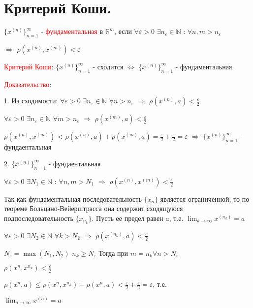 \section{Критерий Коши.}

$\{x^{(n)}\}_{n=1}^{\infty}$ - \textcolor{red} {фундаментальная} в $\mathbb {R}^m$, если $\forall \varepsilon > 0$ $\exists n_\varepsilon \in \mathbb {N}$ : $\forall n, m > n_\varepsilon$

$\Rightarrow$ $\rho (x^{(n)}, x^{(m)})  < \varepsilon$
\vspace{1cm}

\textcolor{red}{Критерий Коши}:  $\{x^{(n)}\}_{n=1}^{\infty}$ - сходится $\Leftrightarrow$ $\{x^{(n)}\}_{n=1}^{\infty}$ - фундаментальная.
\vspace{1cm}

\textcolor{red}{Доказательство}:

1. Из сходимости: $\forall \varepsilon > 0$ $ \exists n_\varepsilon \in \mathbb {N}$ $\forall n > n_\varepsilon $ $\Rightarrow$ $\rho(x^{(n)}, a) < \frac{\varepsilon}{2}$

$\forall \varepsilon > 0$ $\exists n_\varepsilon \in \mathbb {N}$ $\forall m > n_\varepsilon $ $\Rightarrow$ $\rho(x^{(m)}, a) < \frac{\varepsilon}{2}$


$\rho(x^{(n)}, x^{(m)})$ < $\rho(x^{(n)}, a) + \rho(x^{(m)}, a) = \frac{\varepsilon}{2} + \frac{\varepsilon}{2} = \varepsilon$ $\Rightarrow$
$\{x^{(n)}\}_{n=1}^{\infty}$ - фундаентальная
\vspace{1cm}

2. $\{x^{(n)}\}_{n=1}^{\infty}$ - фундаентальная 

$\forall \varepsilon > 0$ $\exists N_1 \in \mathbb {N}$ : $\forall n, m > N_1$ $\Rightarrow$ $\rho (x^{(n)}, x^{(m)})  < \frac{\varepsilon}{2}$

Так как фундаментальная последовательность $\{x_n\}$ является ограниченной, то по теореме Больцано-Вейерштрасса она содержит сходящуюся подпоследовательность $\{x_{n_k}\}$. Пусть ее предел равен $a$, т.е. $\lim_{k\to\infty} x^{(n_k)} = a$

$\forall \varepsilon > 0$ $\exists N_2 \in \mathbb {N}$ $\forall k > N_2$ $\Rightarrow$ $\rho (x^{(n_k)}, a)  < \frac{\varepsilon}{2}$

$N_\varepsilon = \max(N_1, N_2)$ 
$n_k \ge N_\varepsilon$
Тогда при $m = n_k \forall n > N_\varepsilon$ 

$\rho (x^n, x^{n_k}) < \frac{\varepsilon}{2}$

$\rho (x^n, a) \leq \rho (x^n, x^{n_k}) + \rho (x^n, a) < \frac{\varepsilon}{2} + \frac{\varepsilon}{2} = \varepsilon$, т.е.

$\lim_{n\to\infty} x^{(n)} = a$
